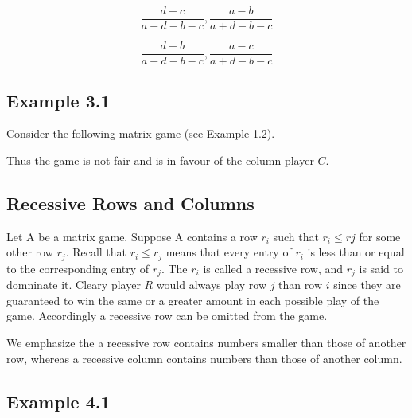\documentclass[]{report}
\begin{document}
\[ \frac{d-c}{a+d-b-c}, \frac{a-b}{a+d-b-c}\]


\[ \frac{d-b}{a+d-b-c}, \frac{a-c}{a+d-b-c}\]

\subsection*{Example 3.1}
Consider the following matrix game (see Example 1.2).

Thus the game is not fair and is in favour of the column player $C$.

\subsection{Recessive Rows and Columns}

Let A be a matrix game. Suppose A contains a row $r_i$ such that $r_i \leq rj$ for some other
row $r_j$.
Recall that $r_i\leq r_j$ means that every entry of $r_i$ is less than or equal to the corresponding entry of $r_j$.
The $r_i$ is called a recessive row, and $r_j$ is said to domninate it.
Cleary player $R$ would always play row $j$ than row $i$ since they are guaranteed to win the same or a greater amount in each possible play of the game.
Accordingly a recessive row can be omitted from the game.

We emphasize the a recessive row contains numbers smaller than those of another
row, whereas a recessive column contains numbers than those of another column.
\subsection{Example 4.1}
\end{document}
